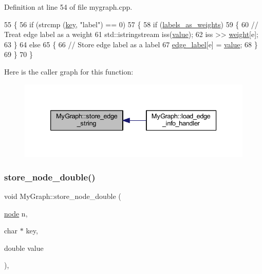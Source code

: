 Definition at line 54 of file mygraph.\+cpp.


\begin{DoxyCode}
55 \{
56     \textcolor{keywordflow}{if} (strcmp (\mbox{\hyperlink{struct_g_m_l__pair_a00e5de36c09fef63b8d439b4341f0655}{key}}, \textcolor{stringliteral}{"label"}) == 0)
57     \{
58         \textcolor{keywordflow}{if} (\mbox{\hyperlink{class_my_graph_a1c451264db5a154029533d9368b90317}{labels\_as\_weights}})
59         \{
60             \textcolor{comment}{// Treat edge label as a weight}
61             std::istringstream iss(\mbox{\hyperlink{struct_g_m_l__pair_aef8797e7d2fc0d2e2f628ce9c2783a6c}{value}});
62             iss >> \mbox{\hyperlink{class_my_graph_aa6e12f16153220780e9db1eb30112b34}{weight}}[e];
63         \}
64         \textcolor{keywordflow}{else}
65         \{
66             \textcolor{comment}{// Store edge label as a label}
67             \mbox{\hyperlink{class_my_graph_ac87b3f22352ddc7ec3864173a0d69cdd}{edge\_label}}[e] = \mbox{\hyperlink{struct_g_m_l__pair_aef8797e7d2fc0d2e2f628ce9c2783a6c}{value}};
68         \}
69     \}
70 \}
\end{DoxyCode}
Here is the caller graph for this function\+:
\nopagebreak
\begin{figure}[H]
\begin{center}
\leavevmode
\includegraphics[width=333pt]{class_my_graph_a3f10b4d50b97fc6f33a767e9db7fdd8b_icgraph}
\end{center}
\end{figure}
\mbox{\label{class_my_graph_a16b037dbb0011fc50367145c477ac7a4}} 
\subsubsection{\texorpdfstring{store\+\_\+node\+\_\+double()}{store\_node\_double()}}
{\footnotesize\ttfamily void My\+Graph\+::store\+\_\+node\+\_\+double (\begin{DoxyParamCaption}\item[{\mbox{\hyperlink{classnode}{node}}}]{n,  }\item[{char $\ast$}]{key,  }\item[{double}]{value }\end{DoxyParamCaption})\hspace{0.3cm}{\ttfamily [virtual]}, {\ttfamily [inherited]}}



